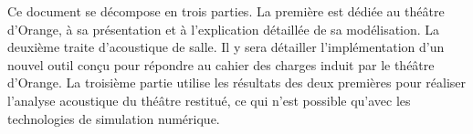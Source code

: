 Ce document se décompose en trois parties. La première est dédiée au théâtre d'Orange, à sa présentation et à l'explication détaillée de sa modélisation. La deuxième traite d'acoustique de salle. Il y sera détailler l'implémentation d'un nouvel outil conçu pour répondre au cahier des charges induit par le théâtre d'Orange. La troisième partie utilise les résultats des deux premières pour réaliser l'analyse acoustique du théâtre restitué, ce qui n'est possible qu'avec les technologies de simulation numérique. 

	